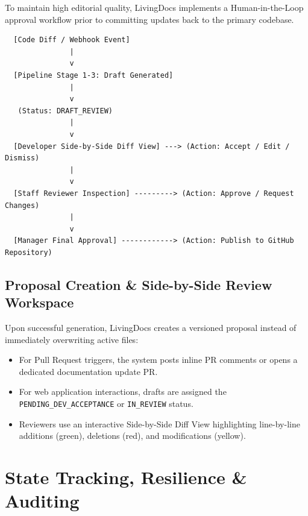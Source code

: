 To maintain high editorial quality, LivingDocs implements a Human-in-the-Loop approval workflow prior to committing updates back to the primary codebase.

\begin{verbatim}
  [Code Diff / Webhook Event]
               |
               v
  [Pipeline Stage 1-3: Draft Generated]
               |
               v
   (Status: DRAFT_REVIEW)
               |
               v
  [Developer Side-by-Side Diff View] ---> (Action: Accept / Edit / Dismiss)
               |
               v
  [Staff Reviewer Inspection] ---------> (Action: Approve / Request Changes)
               |
               v
  [Manager Final Approval] ------------> (Action: Publish to GitHub Repository)
\end{verbatim}

\subsection{Proposal Creation \& Side-by-Side Review Workspace}
Upon successful generation, LivingDocs creates a versioned proposal instead of immediately overwriting active files:
\begin{itemize}
    \item For Pull Request triggers, the system posts inline PR comments or opens a dedicated documentation update PR.
    \item For web application interactions, drafts are assigned the \texttt{PENDING\_DEV\_ACCEPTANCE} or \texttt{IN\_REVIEW} status.
    \item Reviewers use an interactive Side-by-Side Diff View highlighting line-by-line additions (green), deletions (red), and modifications (yellow).
\end{itemize}

\section{State Tracking, Resilience \& Auditing}

